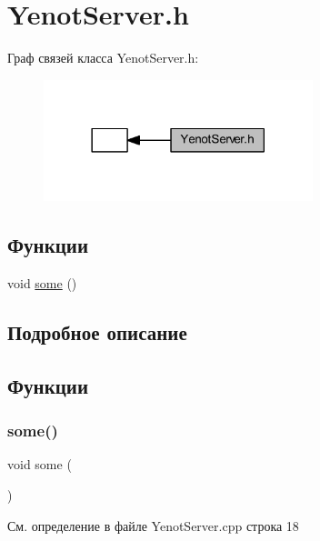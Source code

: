 \hypertarget{group__serveryenotserverh}{}\section{Yenot\+Server.\+h}
\label{group__serveryenotserverh}
Граф связей класса Yenot\+Server.\+h\+:
\nopagebreak
\begin{figure}[H]
\begin{center}
\leavevmode
\includegraphics[width=222pt]{group__serveryenotserverh}
\end{center}
\end{figure}
\subsection*{Функции}
\begin{DoxyCompactItemize}
\item 
void \mbox{\hyperlink{group__serveryenotserverh_ga3bf507bc2b43ea8ed45bdfeaf8d11171}{some}} ()
\end{DoxyCompactItemize}


\subsection{Подробное описание}


\subsection{Функции}
\mbox{\label{group__serveryenotserverh_ga3bf507bc2b43ea8ed45bdfeaf8d11171}} 
\subsubsection{\texorpdfstring{some()}{some()}}
{\footnotesize\ttfamily void some (\begin{DoxyParamCaption}{ }\end{DoxyParamCaption})}



См. определение в файле Yenot\+Server.\+cpp строка 18

